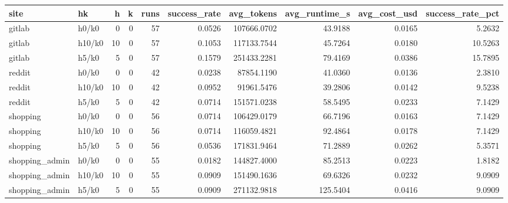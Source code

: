 \begin{tabular}{llrrrrrrrr}
\toprule
site & hk & h & k & runs & success_rate & avg_tokens & avg_runtime_s & avg_cost_usd & success_rate_pct \\
\midrule
gitlab & h0/k0 & 0 & 0 & 57 & 0.0526 & 107666.0702 & 43.9188 & 0.0165 & 5.2632 \\
gitlab & h10/k0 & 10 & 0 & 57 & 0.1053 & 117133.7544 & 45.7264 & 0.0180 & 10.5263 \\
gitlab & h5/k0 & 5 & 0 & 57 & 0.1579 & 251433.2281 & 79.4169 & 0.0386 & 15.7895 \\
reddit & h0/k0 & 0 & 0 & 42 & 0.0238 & 87854.1190 & 41.0360 & 0.0136 & 2.3810 \\
reddit & h10/k0 & 10 & 0 & 42 & 0.0952 & 91961.5476 & 39.2806 & 0.0142 & 9.5238 \\
reddit & h5/k0 & 5 & 0 & 42 & 0.0714 & 151571.0238 & 58.5495 & 0.0233 & 7.1429 \\
shopping & h0/k0 & 0 & 0 & 56 & 0.0714 & 106429.0179 & 66.7196 & 0.0163 & 7.1429 \\
shopping & h10/k0 & 10 & 0 & 56 & 0.0714 & 116059.4821 & 92.4864 & 0.0178 & 7.1429 \\
shopping & h5/k0 & 5 & 0 & 56 & 0.0536 & 171831.9464 & 71.2889 & 0.0262 & 5.3571 \\
shopping_admin & h0/k0 & 0 & 0 & 55 & 0.0182 & 144827.4000 & 85.2513 & 0.0223 & 1.8182 \\
shopping_admin & h10/k0 & 10 & 0 & 55 & 0.0909 & 151490.1636 & 69.6326 & 0.0232 & 9.0909 \\
shopping_admin & h5/k0 & 5 & 0 & 55 & 0.0909 & 271132.9818 & 125.5404 & 0.0416 & 9.0909 \\
\bottomrule
\end{tabular}
